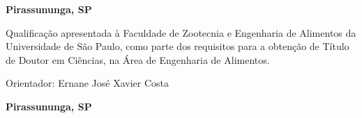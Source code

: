 \pagestyle{empty}

\begin{titlepage}


\begin{center}
{\LARGE \nomedoaluno}
\par
\vspace{200pt}
{\Huge \titulo}
\par
\vfill
\textbf{{\large Pirassununga, SP}\\
{\large \the\year}}
\end{center}
\end{titlepage}





\thispagestyle{empty}

\begin{center}
{\LARGE \nomedoaluno}
\par
\vspace{200pt}
{\Huge \titulo}
\end{center}
\par
\vspace{90pt}
\hspace*{175pt}\parbox{7.6cm}{{\large Qualificação apresentada à Faculdade de Zootecnia e Engenharia de Alimentos da Universidade de São Paulo, como parte dos requisitos para a obtenção de Título de Doutor em Ciências, na Área de Engenharia de Alimentos.}}

\par
\vspace{1em}
\hspace*{175pt}\parbox{7.6cm}{{\large Orientador: Ernane José Xavier Costa}}

\par
\vfill
\begin{center}
\textbf{{\large Pirassununga, SP}\\
{\large \the\year}}
\end{center}

